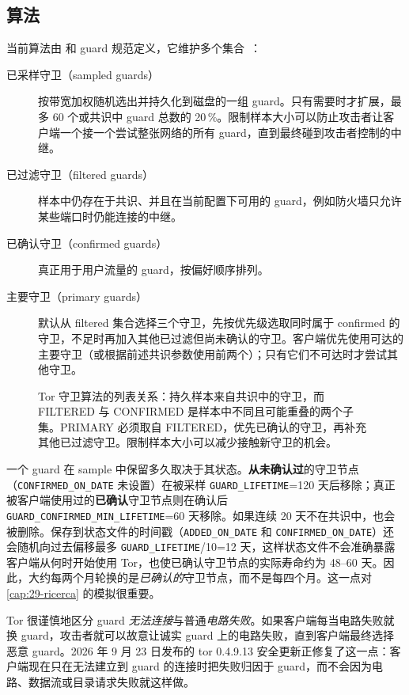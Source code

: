 \subsection{算法}

当前算法由  和 guard 规范定义，它维护多个集合~：
\begin{description}
  \item[已采样守卫（sampled guards）] 按带宽加权随机选出并持久化到磁盘的一组 guard。只有需要时才扩展，最多 60 个或共识中 guard 总数的 20\,\%。限制样本大小可以防止攻击者让客户端一个接一个尝试整张网络的所有 guard，直到最终碰到攻击者控制的中继。
  \item[已过滤守卫（filtered guards）] 样本中仍存在于共识、并且在当前配置下可用的 guard，例如防火墙只允许某些端口时仍能连接的中继。
  \item[已确认守卫（confirmed guards）] 真正用于用户流量的 guard，按偏好顺序排列。
  \item[主要守卫（primary guards）] 默认从 filtered 集合选择三个守卫，先按优先级选取同时属于 confirmed 的守卫，不足时再加入其他已过滤但尚未确认的守卫。客户端优先使用可达的主要守卫（或根据前述共识参数使用前两个）；只有它们不可达时才尝试其他守卫。
\end{description}

\begin{figure}[htbp]
\centering

\caption{Tor 守卫算法的列表关系：持久样本来自共识中的守卫，而 FILTERED 与 CONFIRMED 是样本中不同且可能重叠的两个子集。PRIMARY 必须取自 FILTERED，优先已确认的守卫，再补充其他已过滤守卫。限制样本大小可以减少接触新守卫的机会。}
\label{fig:guard}
\end{figure}

一个 guard 在 sample 中保留多久取决于其状态。\textbf{从未确认过}的守卫节点（\texttt{CONFIRMED\_ON\_DATE} 未设置）在被采样 \texttt{GUARD\_LIFETIME}=120 天后移除；真正被客户端使用过的\textbf{已确认}守卫节点则在确认后 \texttt{GUARD\_CONFIRMED\_MIN\_LIFETIME}=60 天移除。如果连续 20 天不在共识中，也会被删除。保存到状态文件的时间戳（\texttt{ADDED\_ON\_DATE} 和 \texttt{CONFIRMED\_ON\_DATE}）还会随机向过去偏移最多 \texttt{GUARD\_LIFETIME}/10=12 天，这样状态文件不会准确暴露客户端从何时开始使用 Tor，也使已确认守卫节点的实际寿命约为 48--60 天。因此，大约每两个月轮换的是\emph{已确认的}守卫节点，而不是每四个月。这一点对 \cref{cap:29-ricerca} 的模拟很重要。

\begin{attenzione}
Tor 很谨慎地区分 guard \emph{无法连接}与普通\emph{电路失败}。如果客户端每当电路失败就换 guard，攻击者就可以故意让诚实 guard 上的电路失败，直到客户端最终选择恶意 guard。2026 年 9 月 23 日发布的 tor 0.4.9.13 安全更新正修复了这一点：客户端现在只在无法建立到 guard 的连接时把失败归因于 guard，而不会因为电路、数据流或目录请求失败就这样做。
\end{attenzione}


